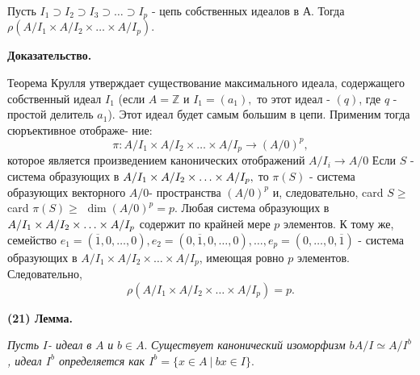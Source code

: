 \documentclass{mai_book}
\begin{document}
	
	\setcounter{page}{327} %
	
	Пусть $I_{1} \supset I_{2} \supset I_{3} \supset \ldots \supset I_{p}$ - цепь собственных идеалов в А. Тогда \linebreak
	$\rho(A/I_{1} \times A/I_{2} \times \ldots \times A/I_{p}).$ %
	
	
	{\bf Доказательство.}
	
	Теорема Крулля утверждает существование максимального идеала, содержащего собственный идеал $I_{1}$ (если $A = \mathbb Z$ и $I_{1} = (a_{1}),$ то\linebreak
	этот идеал - $(q)$, где $q$ - простой делитель $a_{1}$). Этот идеал будет\linebreak
	самым большим в цепи. Применим тогда сюръективное отображе-\linebreak
	ние:
	$$\pi : A/I_{1} \times A/I_{2} \times \ldots \times A/I_{p} \rightarrow (A/0)^{p},$$
	которое является произведением канонических отображений\linebreak
	$A/I_{i} \rightarrow A/0$ Если $S$ - система образующих в $A/I_{1} \times A/I_{2} \times \linebreak
	\ldots \times A/I_{p},$ то $\pi(S)$ - система образующих векторного $A/0$-\linebreak
	пространства $(A/0)^{p}$ и, следовательно, card $S \geqslant $ card $\pi (S) \geqslant$\linebreak
	$\dim(A/0)^{p} = p. $ Любая система образующих в  $A/I_{1} \times A/I_{2} \times \ldots \times \linebreak
	A/I_{p}$ содержит по крайней мере $p$ элементов. К тому же, семейство \linebreak
	$e_{1} =  (\overline{1}, 0, \ldots, 0), e_{2} = (0, \overline{1}, 0, \ldots, 0), \ldots, e_{p} = (0, \ldots, 0, \overline{1})$ - система \linebreak
	образующих в $A/I_{1} \times A/I_{2} \times \ldots \times A/I_{p}$, имеющая ровно $p$ элементов.\linebreak
	Следовательно,
	$$\rho (A/I_{1} \times A/I_{2} \times \ldots \times A/I_{p}) = p. $$
	
	{\bf(21) Лемма.}
	
	{\it Пусть} $I${\it - идеал в} $A$ {\it и} $b \in A.$ {\it Существует канонический изоморфизм\linebreak
	$bA/I\simeq A/I^{b}$, идеал $I^{b}$ определяется как $I^{b} = \{ x \in A \ | \ bx \in I\} .$}
	
\end{document}
